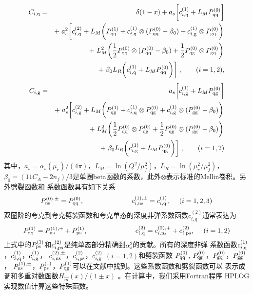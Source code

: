 \begin{eqnarray}
\label{eq:WF-S-quark}
C_{i, {\rm q}}
&=&
\delta(1-x)
+ a_s \biggl[ c_{i, {\rm q}}^{(1)} + L_M P_{{\rm qq}}^{(0)} \biggr] \nonumber \\
&& +
\left.
a_s^2
\biggl[ c_{i, {\rm q}}^{(2)}
+ L_M
\biggl(
P_{{\rm qq}}^{(1)} + c_{i, {\rm q}}^{(1)} \otimes (P_{{\rm qq}}^{(0)} - \beta_0)
+ c_{i, {\rm g}}^{(1)} \otimes P_{{\rm gq}}^{(0)}
\biggr)
\right. \nonumber \\
&& +
\left.
L_M^2
\biggl(
\frac{1}{2} P_{{\rm qq}}^{(0)} \otimes (P_{{\rm qq}}^{(0)} - \beta_0)
+ \frac{1}{2} P_{{\rm qg}}^{(0)} \otimes P_{{\rm gq}}^{(0)}
\biggr)
\right. \nonumber \\
&& +
\left.
\beta_0 L_R
\biggl( c_{i, {\rm q}}^{(1)} + L_M P_{{\rm qq}}^{(0)} \biggr)
\biggr]
\right., \qquad (i = 1, 2),
\end{eqnarray}
\begin{eqnarray}
\label{eq:WF-S-gluon}
C_{i, {\rm g}}
&=&
a_s \biggl[ c_{i, {\rm g}}^{(1)} + L_M P_{{\rm qg}}^{(0)} \biggr] \nonumber \\
&& +
\left.
a_s^2
\biggl[ c_{i, {\rm g}}^{(2)}
+ L_M
\biggl(
P_{{\rm qg}}^{(1)} + c_{i, {\rm q}}^{(1)} \otimes P_{{\rm qg}}^{(0)}
+ c_{i, {\rm g}}^{(1)} \otimes (P_{{\rm gg}}^{(0)} - \beta_0)
\biggr)
\right. \nonumber \\
&& +
\left.
L_M^2
\biggl(
\frac{1}{2} P_{{\rm qq}}^{(0)} \otimes P_{{\rm qg}}^{(0)}
+ \frac{1}{2} P_{{\rm qg}}^{(0)} \otimes (P_{{\rm gg}}^{(0)} - \beta_0)
\biggr)
\right. \nonumber \\
&& +
\left.
\beta_0 L_R
\biggl( c_{i, {\rm g}}^{(1)} + L_M P_{{\rm qg}}^{(0)} \biggr)
\biggr]
\right., \qquad (i = 1, 2)
\end{eqnarray}
其中，$a_s =  \alpha_s(\mu_r)/(4\pi)$，$L_M = \ln(Q^2/\mu^2_f)$，$L_R = \ln(\mu^2_r/\mu^2_f)$，
$\beta_0 = (11 C_A - 2 n_f)/3$是单圈beta函数的系数，此外$\otimes$表示标准的Mellin卷积。另外劈裂函数和
系数函数具有如下关系
\begin{eqnarray}
P_{{\rm ns}}^{(0), \pm}
=
P_{{\rm qq}}^{(0)},~~~~~~~~~~~~~~~~~~~~~
c_{i, {\rm ns}}^{(1), \pm}
=
c_{i, {\rm q}}^{(1)},~~~~
(i = 1, 2, 3)
\end{eqnarray}
双圈阶的夸克到夸克劈裂函数和夸克单态的深度非弹系数函数$c^{(2)}_{i,q}$通常表达为
\begin{eqnarray}
P_{{\rm qq}}^{(1)} = P_{{\rm ns}}^{(1), +} + P_{{\rm ps}}^{(1)},~~~~~~~~~~~~~~~~~~~~~
c_{i, {\rm q}}^{(2)} = c_{i, {\rm ns}}^{(2), +} + c_{i, {\rm ps}}^{(2)},~~~~(i = 1, 2)
\end{eqnarray}
上式中的$P_{{\rm ps}}^{(1)}$和$c_{i, {\rm ps}}^{(2)}$是纯单态部分精确到$\alpha^2_s$的贡献。所有的深度非弹
系数函数$c_{i, {\rm q}}^{(1)}$，$c_{3, {\rm q}}^{(1)}$，$c_{i, {\rm g}}^{(1)}$，
$c_{i, {\rm ns}}^{(2), \pm}$，$c_{i, {\rm ps}}^{(2)}$，$c_{i, {\rm g}}^{(2)}$ $(i = 1, 2)$和劈裂函数
$P_{{\rm qq}}^{(0)}$, $P_{{\rm qg}}^{(0)}$，$P_{{\rm gq}}^{(0)}$，$P_{{\rm gg}}^{(0)}$，
$P_{{\rm ns}}^{(1), \pm}$，$P_{{\rm ps}}^{(1)}$，$P_{{\rm qg}}^{(1)}$可以在文献\cite{vanNeerven:1999ns,
vanNeerven:1999distl,vanNeerven:2000uj,Vermaseren:2005qc,Moch:2008fj}中找到。这些系数函数和劈裂函数可以
表示成调和多重对数函数$H_{\vec{m}}(x)/(1 \pm x)$ \cite{Remiddi:1999ew}。在计算中，我们采用Fortran程序
HPLOG\cite{Gehrmann}实现数值计算这些特殊函数。

